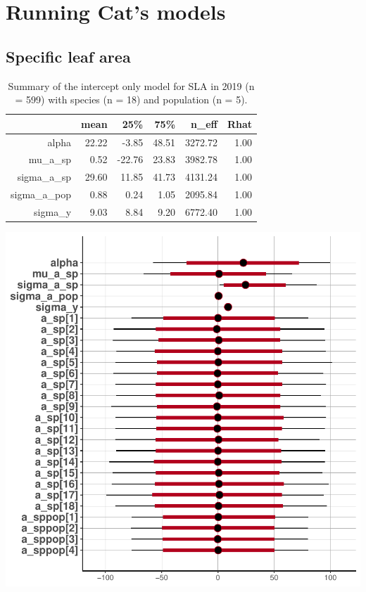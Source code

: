 \documentclass{article}
\begin{document}


\section*{Running Cat's models}

\subsection*{Specific leaf area}
\begin{table}[ht]
\centering
\caption{Summary of the intercept only model for SLA in 2019 (n = 599) with species (n = 18) and population (n = 5).} 
\begin{tabular}{rrrrrr}
  \hline
 & mean & 25\% & 75\% & n\_eff & Rhat \\ 
  \hline
alpha & 22.22 & -3.85 & 48.51 & 3272.72 & 1.00 \\ 
  mu\_a\_sp & 0.52 & -22.76 & 23.83 & 3982.78 & 1.00 \\ 
  sigma\_a\_sp & 29.60 & 11.85 & 41.73 & 4131.24 & 1.00 \\ 
  sigma\_a\_pop & 0.88 & 0.24 & 1.05 & 2095.84 & 1.00 \\ 
  sigma\_y & 9.03 & 8.84 & 9.20 & 6772.40 & 1.00 \\ 
  \end{tabular}
\end{table}
\includegraphics{traitsCG-fig3}
\end{document}
